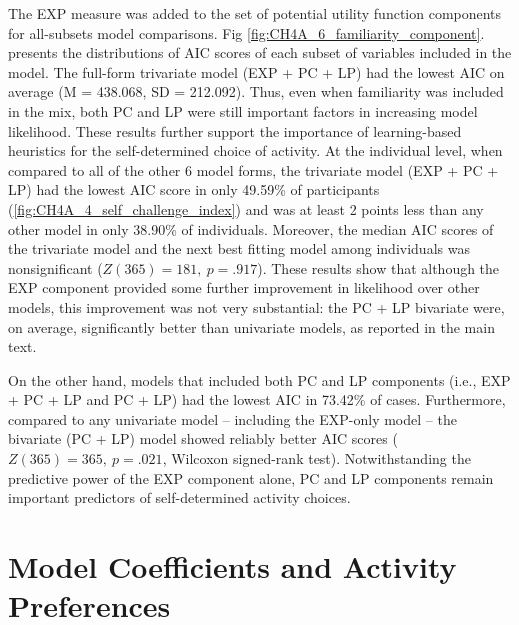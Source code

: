 \begin{subappendices}
The \ac{EXP} measure was added to the set of potential utility function components for all-subsets model comparisons. Fig \cref{fig:CH4A_6_familiarity_component}. presents the distributions of AIC scores of each subset of variables included in the model. The full-form trivariate model (\ac{EXP} + \ac{PC} + \ac{LP}) had the lowest AIC on average (M = 438.068, SD = 212.092). Thus, even when familiarity was included in the mix, both \ac{PC} and \ac{LP} were still important factors in increasing model likelihood. These results further support the importance of learning-based heuristics for the self-determined choice of activity. At the individual level, when compared to all of the other 6 model forms, the trivariate model (\ac{EXP} + \ac{PC} + \ac{LP}) had the lowest AIC score in only 49.59\% of participants (\cref{fig:CH4A_4_self_challenge_index}) and was at least 2 points less than any other model in only 38.90\% of individuals. Moreover, the median AIC scores of the trivariate model and the next best fitting model among individuals was nonsignificant ($Z(365) = 181,\ p = .917$). These results show that although the \ac{EXP} component provided some further improvement in likelihood over other models, this improvement was not very substantial: the \ac{PC} + \ac{LP} bivariate were, on average, significantly better than univariate models, as reported in the main text.

On the other hand, models that included both \ac{PC} and \ac{LP} components (i.e., \ac{EXP} + \ac{PC} + \ac{LP} and \ac{PC} + \ac{LP}) had the lowest AIC in 73.42\% of cases. Furthermore, compared to any univariate model -- including the \ac{EXP}-only model -- the bivariate (\ac{PC} + \ac{LP}) model showed reliably better AIC scores ($Z(365) = 365,\ p = .021$, Wilcoxon signed-rank test). Notwithstanding the predictive power of the \ac{EXP} component alone, \ac{PC} and \ac{LP} components remain important predictors of self-determined activity choices.


\section{Model Coefficients and Activity Preferences}\label{CH4A_S_model_coefficients}


\end{subappendices}
